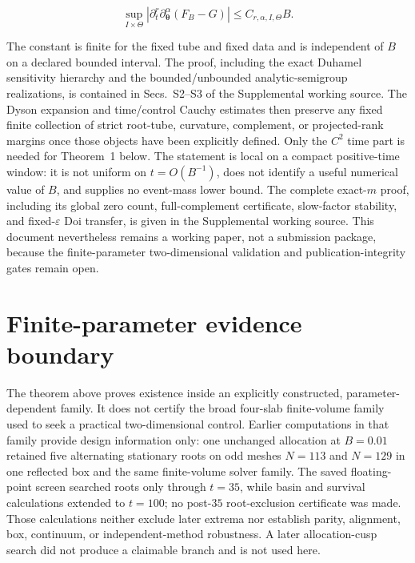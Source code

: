 \documentclass[aps,physrev,reprint,amsmath,amssymb,longbibliography,floatfix]{revtex4-2}
\begin{document}
\begin{equation}
 \sup_{I\times\Theta}
 \left|\partial_t^r\partial_{\bm\theta}^{\alpha}
       (F_B-G)\right|\le C_{r,\alpha,I,\Theta}B.
 \label{eq:mixed-jet-transfer}
\end{equation}

The constant is finite for the fixed tube and fixed data and is independent of
$B$ on a declared bounded interval.  The proof, including the exact Duhamel
sensitivity hierarchy and the bounded/unbounded analytic-semigroup
realizations, is contained in Secs.~S2--S3 of the Supplemental working source.
The Dyson expansion and time/control Cauchy estimates then preserve any fixed
finite collection of strict root-tube, curvature, complement, or
projected-rank margins once those objects have been explicitly defined.  Only
the $C^2$ time part is needed for Theorem~1 below.  The statement is local on a
compact positive-time window: it is not uniform on $t=O(B^{-1})$, does not
identify a useful numerical value of $B$, and supplies no event-mass lower
bound.  The complete exact-$m$ proof, including its global zero count,
full-complement certificate, slow-factor stability, and fixed-$\varepsilon$
Doi transfer, is given in the Supplemental working source.  This document
nevertheless remains a working paper, not a submission package, because the
finite-parameter two-dimensional validation and publication-integrity gates
remain open.



\section{Finite-parameter evidence boundary}
\label{sec:evidence-boundary}

The theorem above proves existence inside an explicitly constructed,
parameter-dependent family.  It does not certify the broad four-slab
finite-volume family used to seek a practical two-dimensional control.  Earlier
computations in that family provide design information only: one unchanged
allocation at $B=0.01$ retained five alternating stationary roots on odd
meshes $N=113$ and $N=129$ in one reflected box and the same finite-volume
solver family.  The saved floating-point screen searched roots only through
$t=35$, while basin and survival calculations extended to $t=100$; no
post-$35$ root-exclusion certificate was made.  Those calculations neither
exclude later extrema nor establish parity, alignment, box, continuum, or
independent-method robustness.  A later allocation-cusp search did not produce
a claimable branch and is not used here.
\end{document}
